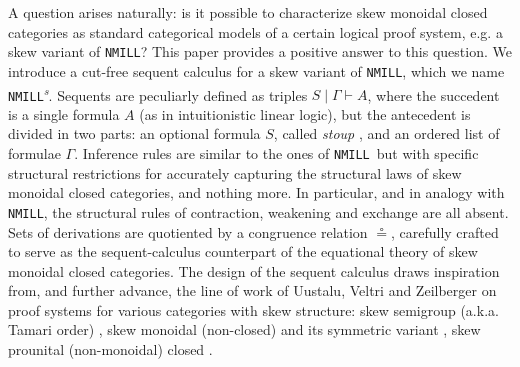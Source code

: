 \documentclass[submission,copyright,creativecommons]{eptcs}
\theoremstyle{definition}
\newcommand{\NMILL}{\texttt{NMILL}}
\newcommand{\SkNMILL}{\NMILL\textsuperscript{\textit{s}}}
\begin{document}
A question arises naturally: is it possible to characterize skew monoidal closed categories as standard categorical models of a certain logical proof system, e.g. a skew variant of \NMILL?
This paper provides a positive answer to this question. We introduce a cut-free sequent calculus for a skew variant of \NMILL, which we name \SkNMILL. Sequents are peculiarly defined as triples $S \mid \Gamma \vdash A$, where the succedent is a single formula $A$ (as in intuitionistic linear logic), but the antecedent is divided in two parts: an optional formula $S$, called \emph{stoup} \cite{girard:constructive:91}, and an ordered list of formulae $\Gamma$. Inference rules are similar to the ones of \NMILL\ but with specific structural restrictions for accurately capturing the structural laws of skew monoidal closed categories, and nothing more. In particular, and in analogy with \NMILL, the structural rules of contraction, weakening and exchange are all absent. Sets of derivations are quotiented by a congruence relation $\circeq$, carefully crafted to serve as the sequent-calculus counterpart of the equational theory of skew monoidal closed categories. The design of the sequent calculus draws inspiration from, and further advance, the line of work of Uustalu, Veltri and Zeilberger on proof systems for various categories with skew structure: skew semigroup (a.k.a. Tamari order) \cite{zeilberger:semiassociative:19}, skew monoidal (non-closed) \cite{uustalu:sequent:2021,uustalu:proof:nodate} and its symmetric variant \cite{veltri:coherence:2021}, skew prounital (non-monoidal) closed \cite{uustalu:deductive:nodate}.
\end{document}
